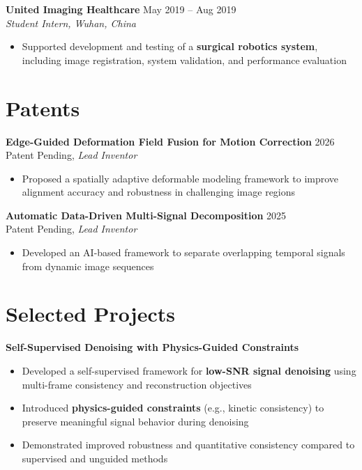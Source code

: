 \textbf{United Imaging Healthcare} \hfill May 2019 -- Aug 2019 \\
\textit{Student Intern, Wuhan, China}
\begin{itemize}[leftmargin=*]
\item Supported development and testing of a \textbf{surgical robotics system}, including image registration, system validation, and performance evaluation
\end{itemize}

\section{Patents}
\textbf{Edge-Guided Deformation Field Fusion for Motion Correction} \hfill 2026 \\
Patent Pending, \textit{Lead Inventor}
\begin{itemize}[leftmargin=*]
\item Proposed a spatially adaptive deformable modeling framework to improve alignment accuracy and robustness in challenging image regions
\end{itemize}

\textbf{Automatic Data-Driven Multi-Signal Decomposition} \hfill 2025 \\
Patent Pending, \textit{Lead Inventor}
\begin{itemize}[leftmargin=*]
\item Developed an AI-based framework to separate overlapping temporal signals from dynamic image sequences
\end{itemize}

\section{Selected Projects}

\textbf{Self-Supervised Denoising with Physics-Guided Constraints}
\begin{itemize}[leftmargin=*]
\item Developed a self-supervised framework for \textbf{low-SNR signal denoising} using multi-frame consistency and reconstruction objectives
\item Introduced \textbf{physics-guided constraints} (e.g., kinetic consistency) to preserve meaningful signal behavior during denoising
\item Demonstrated improved robustness and quantitative consistency compared to supervised and unguided methods
\end{itemize}


